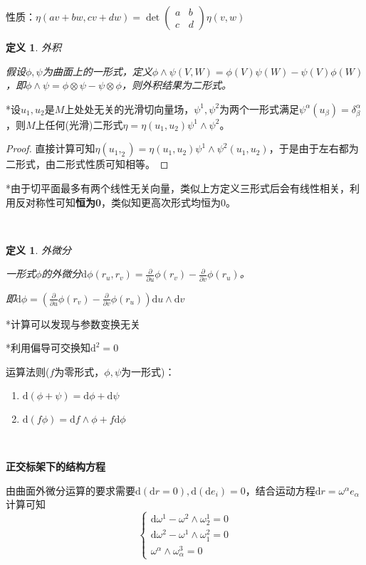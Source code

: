 \documentclass[a4paper,UTF8,fontset=windows]{ctexart}
\newtheorem{dfn}[thm]{定义}
\begin{document}
性质：$\eta(av+bw,cv+dw)=\det\begin{pmatrix}a&b\\c&d\end{pmatrix}\eta(v,w)$

\begin{dfn} 外积

假设$\phi,\psi$为曲面上的一形式，定义$\phi\wedge\psi(V,W)=\phi(V)\psi(W)-\psi(V)\phi(W)$，即$\phi\wedge\psi=\phi\otimes\psi-\psi\otimes\phi$，则外积结果为二形式。
\end{dfn}

*设$u_1,u_2$是$M$上处处无关的光滑切向量场，$\psi^1,\psi^2$为两个一形式满足$\psi^\alpha(u_\beta)=\delta_\beta^\alpha$，则$M$上任何(光滑)二形式$\eta=\eta(u_1,u_2)\psi^1\wedge\psi^2$。

\begin{proof}
直接计算可知$\eta(u_1,_2)=\eta(u_1,u_2)\psi^1\wedge\psi^2(u_1,u_2)$，于是由于左右都为二形式，由二形式性质可知相等。
\end{proof}

*由于切平面最多有两个线性无关向量，类似上方定义三形式后会有线性相关，利用反对称性可知\textbf{恒为0}，类似知更高次形式均恒为0。

\

\begin{dfn} 外微分

一形式$\phi$的外微分$\mathrm{d}\phi(r_u,r_v)=\frac{\partial}{\partial u}\phi(r_v)-\frac{\partial}{\partial v}\phi(r_u)$。

即$\mathrm{d}\phi=(\frac{\partial}{\partial u}\phi(r_v)-\frac{\partial}{\partial v}\phi(r_u))\mathrm{d}u\wedge\mathrm{d}v$
\end{dfn}

*计算可以发现与参数变换无关

*利用偏导可交换知$\mathrm{d}^2=0$

运算法则($f$为零形式，$\phi,\psi$为一形式)：

\begin{enumerate}
    \item $\mathrm{d}(\phi+\psi)=\mathrm{d}\phi+\mathrm{d}\psi$
    \item $\mathrm{d}(f\phi)=\mathrm{d}f\wedge\phi+f\mathrm{d}\phi$
\end{enumerate}

\

\textbf{正交标架下的结构方程}

由曲面外微分运算的要求需要$\mathrm{d}(\mathrm{d}r=0),\mathrm{d}(\mathrm{d}e_i)=0$，结合运动方程$\mathrm{d}r=\omega^\alpha e_\alpha$计算可知
$$\begin{cases}\mathrm{d}\omega^1-\omega^2\wedge\omega_2^1=0\\\mathrm{d}\omega^2-\omega^1\wedge\omega_1^2=0\\\omega^\alpha\wedge\omega_\alpha^3=0\end{cases}$$
\end{document}
